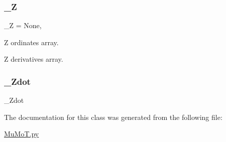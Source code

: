 \subsubsection{\texorpdfstring{\+\_\+Z}{\_Z}}
{\footnotesize\ttfamily \+\_\+Z = None\hspace{0.3cm}{\ttfamily [static]}, {\ttfamily [private]}}



Z ordinates array. 

Z derivatives array. \mbox{\label{class_mu_mo_t_1_1_mu_mo_tfield_view_a4008c2e6651cb1bf1c9c1af3e962a25d}} 
\subsubsection{\texorpdfstring{\+\_\+\+Zdot}{\_Zdot}}
{\footnotesize\ttfamily \+\_\+\+Zdot\hspace{0.3cm}{\ttfamily [private]}}



The documentation for this class was generated from the following file\+:\begin{DoxyCompactItemize}
\item 
\hyperlink{_mu_mo_t_8py}{Mu\+Mo\+T.\+py}\end{DoxyCompactItemize}
